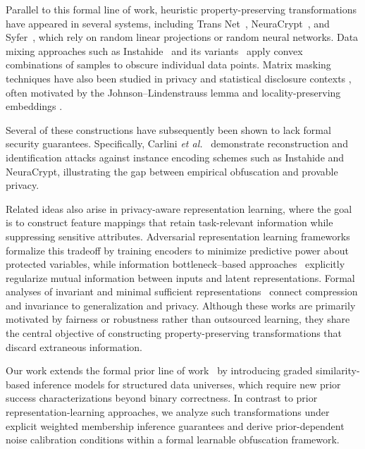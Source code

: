 \documentclass[letterpaper]{article} %
\begin{document}
Parallel to this formal line of work, heuristic property-preserving transformations have appeared in several systems, including Trans Net~\cite{he2020transnet}, NeuraCrypt~\cite{yala2021neuracrypt}, and Syfer~\cite{yala2022syfer}, which rely on random linear projections or random neural networks. Data mixing approaches such as Instahide~\cite{huang2020instahide} and its variants~\cite{borgnia2021dpinstahide,liu2020datamix} apply convex combinations of samples to obscure individual data points. Matrix masking techniques have also been studied in privacy and statistical disclosure contexts \cite{ding2020triple,zhao2018sparse}, often motivated by the Johnson--Lindenstrauss lemma \cite{larsen2017optimality} and locality-preserving embeddings \cite{indyk1997locality}.

Several of these constructions have subsequently been shown to lack formal security guarantees. Specifically, Carlini \textit{et al.}~\cite{carlini2021privatelearning,carlini2021neuracrypt} demonstrate reconstruction and identification attacks against instance encoding schemes such as Instahide and NeuraCrypt, illustrating the gap between empirical obfuscation and provable privacy.

Related ideas also arise in privacy-aware representation learning, where the goal is to construct feature mappings that retain task-relevant information while suppressing sensitive attributes. Adversarial representation learning frameworks~\cite{edwards2015censoring,louppe2017learning} formalize this tradeoff by training encoders to minimize predictive power about protected variables, while information bottleneck--based approaches~\cite{alemi2016deep} explicitly regularize mutual information between inputs and latent representations. Formal analyses of invariant and minimal sufficient representations~\cite{achille2018information} connect compression and invariance to generalization and privacy. Although these works are primarily motivated by fairness or robustness rather than outsourced learning, they share the central objective of constructing property-preserving transformations that discard extraneous information.

Our work extends the formal prior line of work~\cite{xiao2024formal} by introducing graded similarity-based inference models for structured data universes, which require new prior success characterizations beyond binary correctness. In contrast to prior representation-learning approaches, we analyze such transformations under explicit weighted membership inference guarantees and derive prior-dependent noise calibration conditions within a formal learnable obfuscation framework.
\end{document}
